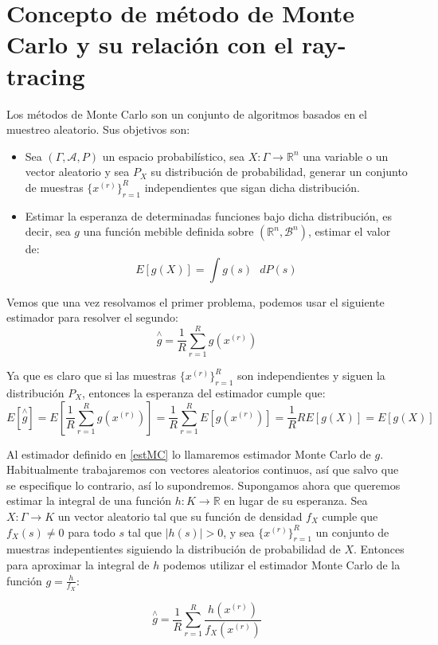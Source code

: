 \section{Concepto de método de Monte Carlo y su relación con el ray-tracing}

Los métodos de Monte Carlo son un conjunto de algoritmos basados en el muestreo aleatorio. Sus objetivos son:

\begin{itemize}
\item Sea $(\Gamma, \mathcal{A}, P)$ un espacio probabilístico, sea $X:\Gamma \rightarrow \mathds{R}^n$ una variable o un vector aleatorio y sea $P_X$ su distribución de probabilidad, generar un conjunto de muestras $\{x^{(r)}\}_{r=1}^R$ independientes que sigan dicha distribución. 
\item Estimar la esperanza de determinadas funciones bajo dicha distribución, es decir, sea $g$ una función mebible definida sobre $(\mathds{R}^n, \mathscr{B}^n)$, estimar el valor de:
$$ E[g(X)] = \int g(s)\text{ }dP(s)$$
\end{itemize}

Vemos que una vez resolvamos el primer problema, podemos usar el siguiente estimador para resolver el segundo:
\begin{equation}\label{estMC}
\overset{\wedge}{g} = \frac{1}{R}\sum_{r=1}^R g(x^{(r)})
\end{equation}

Ya que es claro que si las muestras $\{x^{(r)}\}_{r=1}^R$ son independientes y siguen la distribución $P_X$, entonces la esperanza del estimador cumple que:
$$E[\overset{\wedge}{g}] = E[\frac{1}{R}\sum_{r=1}^R g(x^{(r)})] = \frac{1}{R}\sum_{r=1}^R E[g(x^{(r)})] = \frac{1}{R} R E[g(X)] = E[g(X)]$$

Al estimador definido en \ref{estMC} lo llamaremos estimador Monte Carlo de $g$. Habitualmente trabajaremos con vectores aleatorios continuos, así que salvo que se especifique lo contrario, así lo supondremos. Supongamos ahora que queremos estimar la integral de una función $h:K\rightarrow \mathds{R}$ en lugar de su esperanza. Sea $X:\Gamma \rightarrow K$ un vector aleatorio tal que su función de densidad $f_X$ cumple que $f_X(s)\neq 0$ para todo $s$ tal que $|h(s)|>0$, y sea $\{x^{(r)}\}_{r=1}^R$ un conjunto de muestras indepentientes siguiendo la distribución de probabilidad de $X$. Entonces para aproximar la integral de $h$ podemos utilizar el estimador Monte Carlo de la función $g = \frac{h}{f_X}$:

$$\overset{\wedge}{g} = \frac{1}{R}\sum_{r=1}^R \frac{h(x^{(r)})}{f_X(x^{(r)})}$$

